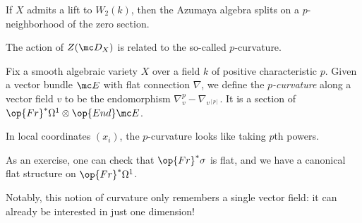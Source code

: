 \documentclass[../notes.tex]{subfiles}
\begin{document}
\begin{remark}
	If $X$ admits a lift to $W_2(k)$, then the Azumaya algebra splits on a $p$-neighborhood of the zero section.
\end{remark}
The action of $Z(\mc D_X)$ is related to the so-called $p$-curvature.
\begin{defihelper}[$p$-curvature] 
	Fix a smooth algebraic variety $X$ over a field $k$ of positive characteristic $p$. Given a vector bundle $\mc E$ with flat connection $\nabla$, we define the \textit{$p$-curvature} along a vector field $v$ to be the endomorphism $\nabla_v^p-\nabla_{v^{[p]}}$. It is a section of $\op{Fr}^*\Omega^1\otimes\op{End}\mc E$.
\end{defihelper}
\begin{remark}
	In local coordinates $(x_i)$, the $p$-curvature looks like taking $p$th powers.
\end{remark}
\begin{remark}
	As an exercise, one can check that $\op{Fr}^*\sigma$ is flat, and we have a canonical flat structure on $\op{Fr}^*\Omega^1$.
\end{remark}
Notably, this notion of curvature only remembers a single vector field: it can already be interested in just one dimension!
\end{document}
